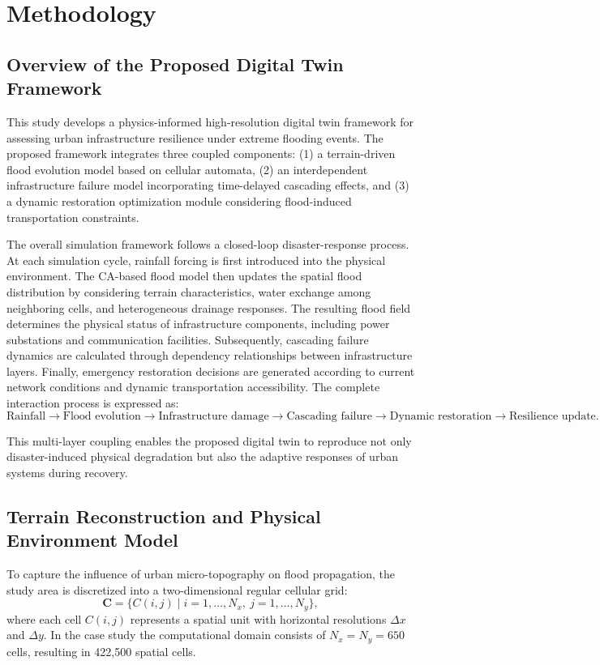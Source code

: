 \documentclass[preprint,12pt]{elsarticle}
\begin{document}
\section{Methodology}\label{sec:method}

\subsection{Overview of the Proposed Digital Twin Framework}
This study develops a physics-informed high-resolution digital twin framework
for assessing urban infrastructure resilience under extreme flooding events.
The proposed framework integrates three coupled components: (1) a
terrain-driven flood evolution model based on cellular automata, (2) an
interdependent infrastructure failure model incorporating time-delayed
cascading effects, and (3) a dynamic restoration optimization module
considering flood-induced transportation constraints.

The overall simulation framework follows a closed-loop disaster-response
process. At each simulation cycle, rainfall forcing is first introduced into
the physical environment. The CA-based flood model then updates the spatial
flood distribution by considering terrain characteristics, water exchange
among neighboring cells, and heterogeneous drainage responses. The resulting
flood field determines the physical status of infrastructure components,
including power substations and communication facilities. Subsequently,
cascading failure dynamics are calculated through dependency relationships
between infrastructure layers. Finally, emergency restoration decisions are
generated according to current network conditions and dynamic transportation
accessibility. The complete interaction process is expressed as:
\begin{equation}\label{eq:loop}
\text{Rainfall} \rightarrow \text{Flood evolution} \rightarrow
\text{Infrastructure damage} \rightarrow \text{Cascading failure}
\rightarrow \text{Dynamic restoration} \rightarrow
\text{Resilience update}.
\end{equation}

This multi-layer coupling enables the proposed digital twin to reproduce not
only disaster-induced physical degradation but also the adaptive responses of
urban systems during recovery.

\subsection{Terrain Reconstruction and Physical Environment Model}
To capture the influence of urban micro-topography on flood propagation, the
study area is discretized into a two-dimensional regular cellular grid:
\begin{equation}\label{eq:grid}
\mathbf{C} = \{C(i,j) \mid i=1,\dots,N_x,\ j=1,\dots,N_y\},
\end{equation}
where each cell $C(i,j)$ represents a spatial unit with horizontal
resolutions $\Delta x$ and $\Delta y$. In the case study the computational
domain consists of $N_x=N_y=650$ cells, resulting in 422{,}500 spatial
cells.
\end{document}
